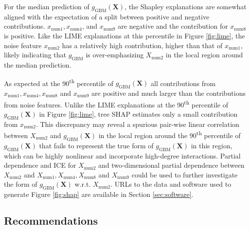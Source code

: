\documentclass[sigconf]{acmart}
\begin{document}
For the median prediction of $g_{\text{GBM}}(\mathbf{X})$, the Shapley explanations are somewhat aligned with the expectation of a split between positive and negative contributions. $x_{\text{num}1}, x_{\text{num}4}$, and $x_{\text{num}9}$ are negative and the contribution for $x_{\text{num}8}$ is positive. Like the LIME explanations at this percentile in Figure \ref{fig:lime}, the noise feature $x_{\text{num}2}$ has a relatively high contribution, higher than that of $x_{\text{num}1}$, likely indicating that $g_{\text{GBM}}$ is over-emphasizing $X_{\text{num}2}$ in the local region around the median prediction. 

As expected at the 90\textsuperscript{th} percentile of $g_{\text{GBM}}(\mathbf{X})$ all contributions from $x_{\text{num}1}, x_{\text{num}4}, x_{\text{num}8}$ and $x_{\text{num}9}$ are positive and much larger than the contributions from noise features. Unlike the LIME explanations at the 90\textsuperscript{th} percentile of $g_{\text{GBM}}(\mathbf{X})$ in Figure \ref{fig:lime}, tree SHAP estimates only a small contribution from $x_{\text{num}2}$. This discrepancy may reveal a spurious pair-wise linear correlation between $X_{\text{num}2}$ and $g_{\text{GBM}}(\mathbf{X})$ in the local region around the 90\textsuperscript{th} percentile of $g_{\text{GBM}}(\mathbf{X})$ that fails to represent the true form of $g_{\text{GBM}}(\mathbf{X})$ in this region, which can be highly nonlinear and incorporate high-degree interactions. Partial dependence and ICE for $X_{\text{num}2}$ and two-dimensional partial dependence between $X_{\text{num}2}$ and $X_{\text{num}1}, X_{\text{num}4}, X_{\text{num}8}$ and $X_{\text{num}9}$ could be used to further investigate the form of $g_{\text{GBM}}(\mathbf{X})$ w.r.t. $X_{\text{num}2}$. URLs to the data and software used to generate Figure \ref{fig:shap} are available in Section \ref{sec:software}.

\subsection{Recommendations}
\end{document}
